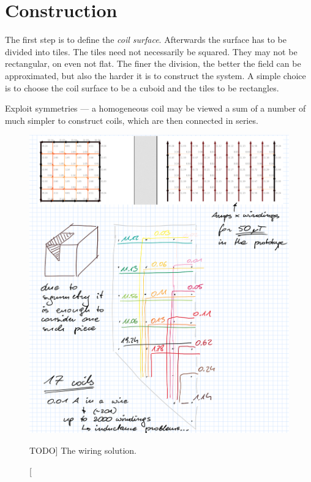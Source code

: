 


\section{Construction}
The first step is to define the \emph{coil surface}. Afterwards the surface has to be divided into tiles. The tiles need not necessarily be squared. They may not be rectangular, on even not flat. The finer the division, the better the field can be approximated, but also the harder it is to construct the system. A simple choice is to choose the coil surface to be a cuboid and the tiles to be rectangles.


Exploit symmetries --- a homogeneous coil may be viewed a sum of a number of
much simpler to construct coils, which are then connected in series.

\begin{figure}
  \centering
  \includegraphics[width=.6\linewidth]{gfx/coils/wiring}
  \caption
  [TODO]
  {%
The wiring solution.}
  \label{fig:coils_wiring}
\end{figure}

